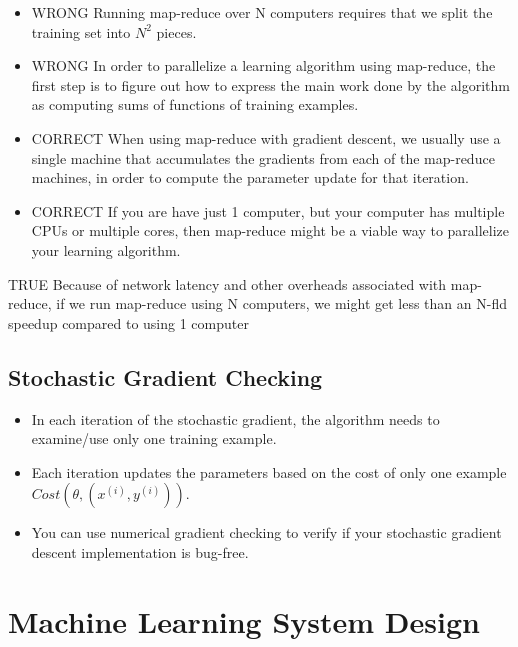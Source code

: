\documentclass[11pt]{article} %
\begin{document}
\begin{itemize}
\item WRONG Running map-reduce over N computers requires that we split the training set into $N^2$ pieces.

\item WRONG In order to parallelize a learning algorithm using map-reduce, the first step is to figure out how to express the main work done by the algorithm as computing sums of functions of training examples.


\item CORRECT  When using map-reduce with gradient descent, we usually use a single machine that accumulates the gradients from each of the map-reduce machines, in order to compute the parameter update for that iteration.


\item CORRECT  If you are have just 1 computer, but your computer has multiple CPUs or multiple cores, then map-reduce might be a viable way to parallelize your learning algorithm.
\end{itemize}

TRUE Because of network latency and other overheads associated with map-reduce, if we run map-reduce using N computers, we might get less than an N-fld speedup compared to using 1 computer




\newpage

\subsection*{Stochastic Gradient Checking}

\begin{itemize}
	\item In each iteration of the stochastic gradient, the algorithm needs to examine/use only one training example.
	\item Each iteration updates the parameters based on the cost of only one example $ Cost (\theta,(x^{(i)},y^{(i)}))$.
	\item You can use numerical gradient checking to verify if your stochastic gradient descent implementation is bug-free.
\end{itemize}
\newpage
\section*{Machine Learning System Design}
\end{document}
